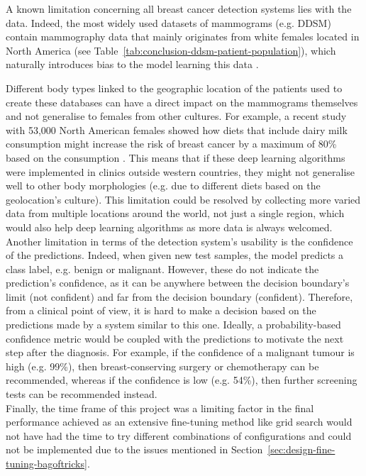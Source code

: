 A known limitation concerning all breast cancer detection systems lies with the data. Indeed, the most widely used datasets of mammograms (e.g. DDSM) contain mammography data that mainly originates from white females located in North America (see Table~\ref{tab:conclusion-ddsm-patient-population}), which naturally introduces bias to the model learning this data \citep{Yala2019}.



Different body types linked to the geographic location of the patients used to create these databases can have a direct impact on the mammograms themselves and not generalise to females from other cultures. For example, a recent study with 53,000 North American females showed how diets that include dairy milk consumption might increase the risk of breast cancer by a maximum of 80\% based on the consumption \citep{Fraser2020}. This means that if these deep learning algorithms were implemented in clinics outside western countries, they might not generalise well to other body morphologies (e.g. due to different diets based on the geolocation's culture). This limitation could be resolved by collecting more varied data from multiple locations around the world, not just a single region, which would also help deep learning algorithms as more data is always welcomed.\\

Another limitation in terms of the detection system's usability is the confidence of the predictions. Indeed, when given new test samples, the model predicts a class label, e.g. benign or malignant. However, these do not indicate the prediction's confidence, as it can be anywhere between the decision boundary's limit (not confident) and far from the decision boundary (confident). Therefore, from a clinical point of view, it is hard to make a decision based on the predictions made by a system similar to this one. Ideally, a probability-based confidence metric would be coupled with the predictions to motivate the next step after the diagnosis. For example, if the confidence of  a malignant tumour is high (e.g. 99\%),  then breast-conserving surgery or chemotherapy can be recommended, whereas if the confidence is low (e.g. 54\%), then further screening tests can be recommended instead.\\

Finally, the time frame of this project was a limiting factor in the final performance achieved as an extensive fine-tuning method like grid search would not have had the time to try different combinations of configurations and could not be implemented due to the issues mentioned in Section~\ref{sec:design-fine-tuning-bagoftricks}.
    
